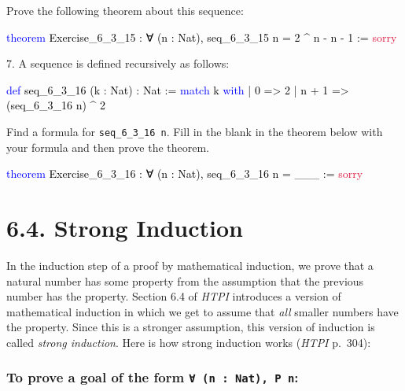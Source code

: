 \documentclass[
  letterpaper,
  DIV=11,
  numbers=noendperiod]{scrreprt}
\newenvironment{Shaded}{\begin{snugshade}}{\end{snugshade}}
\newcommand{\ConstantTok}[1]{\textcolor[rgb]{0.56,0.35,0.01}{#1}}
\newcommand{\KeywordTok}[1]{\textcolor[rgb]{0.00,0.23,0.31}{#1}}
\newcommand{\NormalTok}[1]{\textcolor[rgb]{0.00,0.23,0.31}{#1}}
\renewcommand{\NormalTok}[1]{\textcolor[HTML]{000000}{#1}}
\renewcommand{\KeywordTok}[1]{\textcolor[HTML]{0000FF}{#1}}
\renewcommand{\ConstantTok}[1]{\textcolor[HTML]{DC143C}{#1}}
\theoremstyle{remark}
\begin{document}
Prove the following theorem about this sequence:

\begin{Shaded}
\begin{Highlighting}[]
\KeywordTok{theorem}\NormalTok{ Exercise\_6\_3\_15 : ∀ (n : Nat),}
\NormalTok{    seq\_6\_3\_15 n = 2 \^{} n {-} n {-} 1 := }\ConstantTok{sorry}
\end{Highlighting}
\end{Shaded}

7. A sequence is defined recursively as follows:

\begin{Shaded}
\begin{Highlighting}[]
\KeywordTok{def}\NormalTok{ seq\_6\_3\_16 (k : Nat) : Nat :=}
  \KeywordTok{match}\NormalTok{ k }\KeywordTok{with}
\NormalTok{    | 0 =\textgreater{} 2}
\NormalTok{    | n + 1 =\textgreater{} (seq\_6\_3\_16 n) \^{} 2}
\end{Highlighting}
\end{Shaded}

Find a formula for \texttt{seq\_6\_3\_16\ n}. Fill in the blank in the
theorem below with your formula and then prove the theorem.

\begin{Shaded}
\begin{Highlighting}[]
\KeywordTok{theorem}\NormalTok{ Exercise\_6\_3\_16 : ∀ (n : Nat),}
\NormalTok{    seq\_6\_3\_16 n = \_\_\_ := }\ConstantTok{sorry}
\end{Highlighting}
\end{Shaded}

\hypertarget{strong-induction}{%
\section{6.4. Strong Induction}\label{strong-induction}}

In the induction step of a proof by mathematical induction, we prove
that a natural number has some property from the assumption that the
previous number has the property. Section 6.4 of \emph{HTPI} introduces
a version of mathematical induction in which we get to assume that
\emph{all} smaller numbers have the property. Since this is a stronger
assumption, this version of induction is called \emph{strong induction}.
Here is how strong induction works (\emph{HTPI} p.~304):

\hypertarget{to-prove-a-goal-of-the-form-n-nat-p-n-1}{%
\subsubsection{\texorpdfstring{To prove a goal of the form
\texttt{∀\ (n\ :\ Nat),\ P\ n}:}{To prove a goal of the form ∀ (n : Nat), P n:}}\label{to-prove-a-goal-of-the-form-n-nat-p-n-1}}
\end{document}

